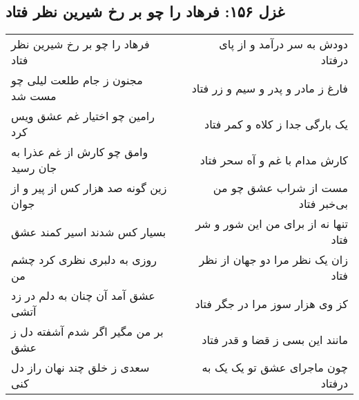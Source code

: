 \begin{center}
\section*{غزل ۱۵۶: فرهاد را چو بر رخ شیرین نظر فتاد}
\label{sec:156}
\begin{longtable}{l p{0.5cm} r}
فرهاد را چو بر رخ شیرین نظر فتاد
&&
دودش به سر درآمد و از پای درفتاد
\\
مجنون ز جام طلعت لیلی چو مست شد
&&
فارغ ز مادر و پدر و سیم و زر فتاد
\\
رامین چو اختیار غم عشق ویس کرد
&&
یک بارگی جدا ز کلاه و کمر فتاد
\\
وامق چو کارش از غم عذرا به جان رسید
&&
کارش مدام با غم و آه سحر فتاد
\\
زین گونه صد هزار کس از پیر و از جوان
&&
مست از شراب عشق چو من بی‌خبر فتاد
\\
بسیار کس شدند اسیر کمند عشق
&&
تنها نه از برای من این شور و شر فتاد
\\
روزی به دلبری نظری کرد چشم من
&&
زان یک نظر مرا دو جهان از نظر فتاد
\\
عشق آمد آن چنان به دلم در زد آتشی
&&
کز وی هزار سوز مرا در جگر فتاد
\\
بر من مگیر اگر شدم آشفته دل ز عشق
&&
مانند این بسی ز قضا و قدر فتاد
\\
سعدی ز خلق چند نهان راز دل کنی
&&
چون ماجرای عشق تو یک یک به درفتاد
\\
\end{longtable}
\end{center}
